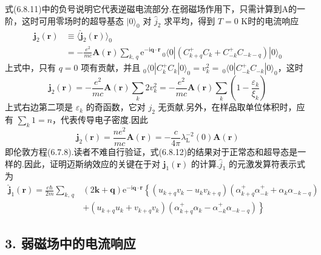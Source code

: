 式(6.8.11)中的负号说明它代表逆磁电流部分.在弱磁场作用下，只需计算到A的一阶，这时可用零场时的超导基态 $|0\rangle_{0}$ 对 $\hat{j}_{2}$ 求平均，得到 $T=0$ K时的电流响应
\begin{equation*}
\begin{aligned}
  \boldsymbol{j}_{2}(\boldsymbol{r})
  &\equiv\langle\hat{\boldsymbol{j}}_{2}(\boldsymbol{r})\rangle_{0}\\
  &=-\frac{e^{2}}{mc}\boldsymbol{A}(\boldsymbol{r})\sum_{k,\,q}
  \mathrm{e}^{-\mathrm{i}\boldsymbol{q}\cdot\boldsymbol{r}}
  \,_{0}\langle0|\left(C^{+}_{k+q}C_{k}+C^{+}_{-k}C_{-k-q}\right)|0\rangle_{0}
\end{aligned}
\end{equation*}
上式中，只有 $q=0$ 项有贡献，并且 $_{0}\langle0|C^{+}_{k}C_{k}|0\rangle_{0}=v_{k}^{2}
=\,_{0}\langle0|C^{+}_{-k}C_{-k}|0\rangle_{0}$，这时
\begin{equation*}
  \boldsymbol{j}_{2}(\boldsymbol{r})=-\frac{e^{2}}{mc}\boldsymbol{A}(\boldsymbol{r})
  \sum_{k}2v_{k}^{2}
  =-\frac{e^{2}}{mc}\boldsymbol{A}(\boldsymbol{r})
  \sum_{k}\left(1-\frac{\varepsilon_{k}}{\xi_{k}}\right)
\end{equation*}
上式右边第二项是 $\varepsilon_{k}$ 的奇函数，它对 $j_{2}$ 无贡献.另外，在样品取单位体积时，应有 $\sum_{k}1=n$，代表传导电子密度.因此
\begin{equation}
  \boldsymbol{j}_{2}(\boldsymbol{r})=\frac{ne^{2}}{mc}\boldsymbol{A}(\boldsymbol{r})
  =-\frac{c}{4\pi}\lambda_{\mathrm{L}}^{-2}(0)\boldsymbol{A}(\boldsymbol{r})
\end{equation}
即伦敦方程(6.7.8).读者不难自行验证，式(6.8.12)的结果对于正常态和超导态是一样的.因此，证明迈斯纳效应的关键在于对 $\boldsymbol{j}_{1}(\boldsymbol{r})$ 的计算.$\hat{j}_{1}$ 的元激发算符表示式为
\begin{equation}
\begin{aligned}
  \hat{\boldsymbol{j}}_{1}(\boldsymbol{r})
  =\frac{e\hbar}{2m}\sum_{k,\,q}&\left(2\boldsymbol{k}+\boldsymbol{q}\right)
  \mathrm{e}^{-\mathrm{i}\boldsymbol{q}\cdot\boldsymbol{r}}
  \left\{\left(u_{k+q}v_{k}-u_{k}v_{k+q}\right)
  \left(\alpha^{+}_{k+q}\alpha^{+}_{-k}
  +\alpha_{k}\alpha_{-k-q}\right)\right.\\
  &+\left.\left(u_{k+q}u_{k}+v_{k+q}v_{k}\right)
  \left(\alpha^{+}_{k+q}\alpha_{k}
  -\alpha^{+}_{-k}\alpha_{-k-q}\right)\right\}
\end{aligned}
\end{equation}

\subsection*{3. 弱磁场中的电流响应}

